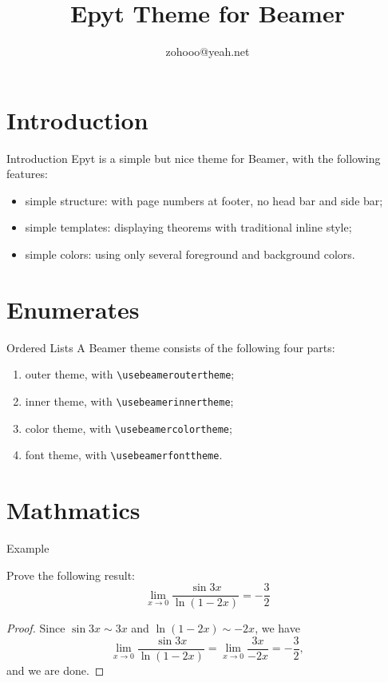 \documentclass[12pt]{beamer}
\title{Epyt Theme for Beamer}
\author{zohooo@yeah.net}
\begin{document}
\begin{frame}[plain]\transboxout
\titlepage
\end{frame}

\begin{frame}\transboxin
\begin{center}
\tableofcontents[hideallsubsections]
\end{center}
\end{frame}


\section{Introduction}

\begin{frame}{Introduction}
Epyt is a simple but nice theme for Beamer, with the following features: \pause
\begin{itemize}[<+->]
\item simple structure: with page numbers at footer, no head bar and side bar;
\item simple templates: displaying theorems with traditional inline style;
\item simple colors: using only several foreground and background colors.
\end{itemize}
\end{frame}


\section{Enumerates}

\begin{frame}[fragile]{Ordered Lists}
A Beamer theme consists of the following four parts: \pause
\begin{enumerate}[<+->]
\item outer theme, with \verb!\usebeameroutertheme!;
\item inner theme, with \verb!\usebeamerinnertheme!;
\item color theme, with \verb!\usebeamercolortheme!;
\item font theme, with \verb!\usebeamerfonttheme!.
\end{enumerate}
\end{frame}


\section{Mathmatics}

\begin{frame}{Example}
\begin{example}
Prove the following result:
\[ \lim_{x\to0}\frac{\sin 3x}{\ln(1-2x)}=-\frac{3}{2} \]
\end{example}\pause
\begin{proof}
Since $\sin 3x \sim 3x$ and $\ln(1-2x) \sim -2x$, we have
\[ \lim_{x\to0}\frac{\sin 3x}{\ln(1-2x)}=\lim_{x\to0}\frac{3x}{-2x}=-\frac{3}{2}, \]
and we are done.
\end{proof}
\end{frame}
\end{document}
